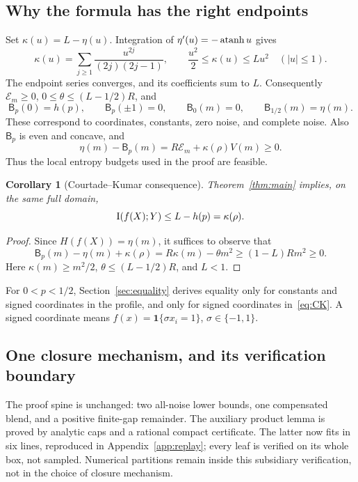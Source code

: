 \documentclass[11pt]{article}
\newtheorem{corollary}[theorem]{Corollary}
\theoremstyle{remark}\newtheorem{remark}[theorem]{Remark}
\newcommand{\Bprof}{\mathsf B_p}\newcommand{\Pprof}{\Phi_p}
\numberwithin{equation}{section}
\begin{document}
\subsection{Why the formula has the right endpoints}
Set $\kappa(u)=L-\eta(u)$. Integration of
$\eta'(u)=-\operatorname{atanh} u$ gives
\begin{equation}\label{eq:kappa-series}
 \kappa(u)=\sum_{j\ge1}\frac{u^{2j}}{(2j)(2j-1)},\qquad
 \frac{u^2}{2}\le\kappa(u)\le Lu^2\quad (|u|\le1).
\end{equation}
The endpoint series converges, and its coefficients sum to $L$.
Consequently $\mathscr E_m\ge0$,
$0\le\theta\le(L-1/2)R$, and
\[
 \Bprof(0)=h(p),\qquad \Bprof(\pm1)=0,\qquad
 \mathsf B_0(m)=0,\qquad \mathsf B_{1/2}(m)=\eta(m).
\]
These correspond to coordinates, constants, zero noise, and complete noise.
Also $\Bprof$ is even and concave, and
\[
 \eta(m)-\Bprof(m)=R\mathscr E_m+\kappa(\rho)V(m)\ge0.
\]
Thus the local entropy budgets used in the proof are feasible.

\begin{corollary}[Courtade--Kumar consequence]\label{cor:CK}
Theorem~\ref{thm:main} implies, on the same full domain,
\begin{equation}\label{eq:CK}
 \operatorname I(f(X);Y)\le L-h(p)=\kappa(\rho).
\end{equation}
\end{corollary}
\begin{proof}
Since $H(f(X))=\eta(m)$, it suffices to observe that
\begin{equation}\label{eq:bias-payment}
 \Bprof(m)-\eta(m)+\kappa(\rho)
 =R\kappa(m)-\theta m^2\ge(1-L)Rm^2\ge0.
\end{equation}
Here $\kappa(m)\ge m^2/2$, $\theta\le(L-1/2)R$, and $L<1$.
\end{proof}
For $0<p<1/2$, Section~\ref{sec:equality} derives equality only for
constants and signed coordinates in the profile, and only for signed
coordinates in~\eqref{eq:CK}. A signed coordinate means
$f(x)=\mathbf1\{\sigma x_i=1\}$, $\sigma\in\{-1,1\}$.


\subsection{One closure mechanism, and its verification boundary}
The proof spine is unchanged: two all-noise lower bounds, one compensated
blend, and a positive finite-gap remainder. The auxiliary product lemma is
proved by analytic caps and a rational compact certificate. The latter now
fits in six lines, reproduced in Appendix~\ref{app:replay}; every leaf is
verified on its whole box, not sampled. Numerical partitions remain inside
this subsidiary verification, not in the choice of closure mechanism.
\end{document}
